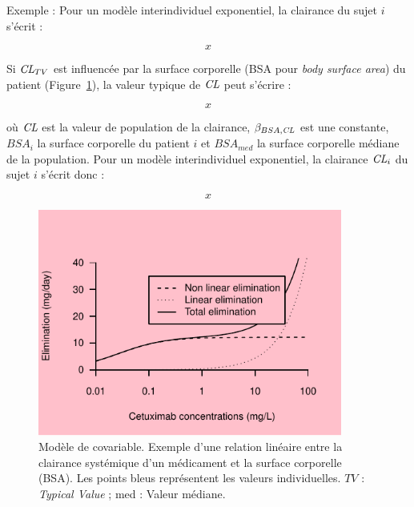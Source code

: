 Exemple : Pour un modèle interindividuel exponentiel, la clairance du sujet $i$ s'écrit :

\begin{equation}
x
\label{eq:46}
\end{equation}

Si $\operatorname{\textit{CL}}_{TV}$ est influencée par la surface corporelle (BSA pour \textit{body surface area}) du patient (Figure~\ref{fig:9}), la valeur typique de $\operatorname{\textit{CL}}$ peut s'écrire :

\begin{equation}
x
\label{eq:47}
\end{equation}

où $\operatorname{\textit{CL}}$ est la valeur de population de la clairance, $\beta_{BSA,\operatorname{\textit{CL}}}$ est une constante, $BSA_i$ la surface corporelle du patient $i$ et $BSA_{med}$ la surface corporelle médiane de la population. Pour un modèle interindividuel exponentiel, la clairance $\operatorname{\textit{CL}}_i$ du sujet $i$ s'écrit donc :

\begin{equation}
x
\label{eq:48}
\end{equation}

\begin{figure}[htbp]
	\centering
		\includegraphics[width=10cm]{images/essai001.pdf}
	\caption[Modèle de covariable.]{Modèle de covariable. Exemple d'une relation linéaire entre la clairance systémique d'un médicament et la surface corporelle (BSA). Les points bleus représentent les valeurs individuelles. $TV$ : \textit{Typical Value} ; med : Valeur médiane.}
	\label{fig:9}
\end{figure}

